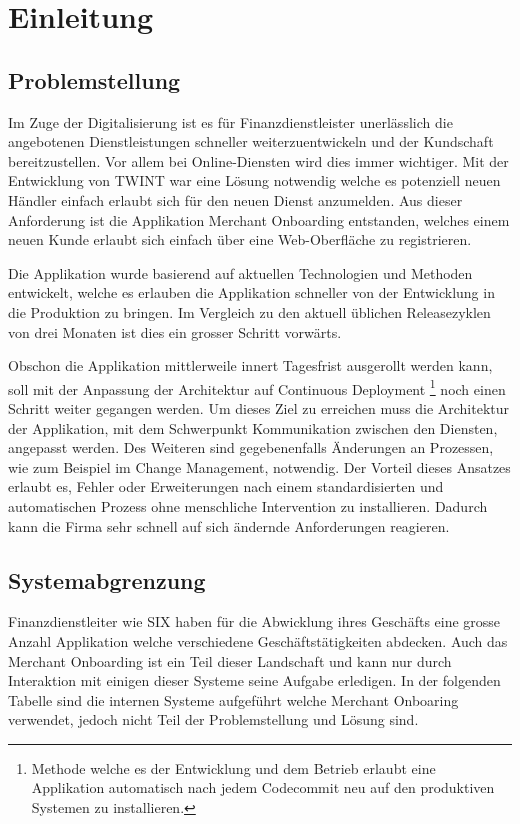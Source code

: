 \chapter{Einleitung}

\section{Problemstellung}

Im Zuge der Digitalisierung ist es für Finanzdienstleister unerlässlich die angebotenen Dienstleistungen schneller weiterzuentwickeln und der Kundschaft bereitzustellen. Vor allem bei Online-Diensten wird dies immer wichtiger. Mit der Entwicklung von TWINT war eine Lösung notwendig welche es potenziell neuen Händler einfach erlaubt sich für den neuen Dienst anzumelden. Aus dieser Anforderung ist die Applikation Merchant Onboarding entstanden, welches einem neuen Kunde erlaubt sich einfach über eine Web-Oberfläche zu registrieren.

Die Applikation wurde basierend auf aktuellen Technologien und Methoden entwickelt, welche es erlauben die Applikation schneller von der Entwicklung in die Produktion zu bringen. Im Vergleich zu den aktuell üblichen Releasezyklen von drei Monaten ist dies ein grosser Schritt vorwärts.

Obschon die Applikation mittlerweile innert Tagesfrist ausgerollt werden kann, soll mit der Anpassung der Architektur auf Continuous Deployment \footnote{Methode welche es der Entwicklung und dem Betrieb erlaubt eine Applikation automatisch nach jedem Codecommit neu auf den produktiven Systemen zu installieren.} noch einen Schritt weiter gegangen werden. Um dieses Ziel zu erreichen muss die Architektur der Applikation, mit dem Schwerpunkt Kommunikation zwischen den Diensten, angepasst werden. Des Weiteren sind gegebenenfalls Änderungen an Prozessen, wie zum Beispiel im Change Management, notwendig.
Der Vorteil dieses Ansatzes erlaubt es, Fehler oder Erweiterungen nach einem standardisierten und automatischen Prozess ohne menschliche Intervention zu installieren. Dadurch kann die Firma sehr schnell auf sich ändernde Anforderungen reagieren.


\section{Systemabgrenzung}
\label{Abgrenzung}

Finanzdienstleiter wie SIX haben für die Abwicklung ihres Geschäfts eine grosse Anzahl Applikation welche verschiedene Geschäftstätigkeiten abdecken. Auch das Merchant Onboarding ist ein Teil dieser Landschaft und kann nur durch Interaktion mit einigen dieser Systeme seine Aufgabe erledigen. In der folgenden Tabelle sind die internen Systeme aufgeführt welche Merchant Onboaring verwendet, jedoch nicht Teil der Problemstellung und Lösung sind.

